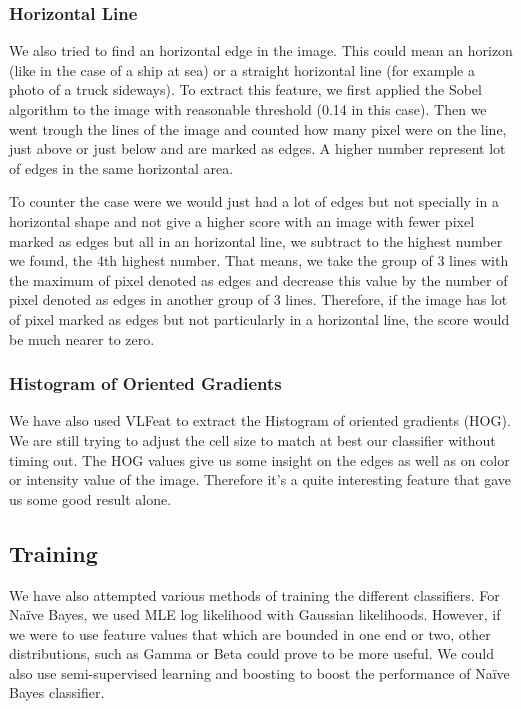 \documentclass{article} %
\begin{document}
\subsubsection{Horizontal Line}

We also tried to find an horizontal edge in the image. This could mean an horizon (like in the case of a ship at sea) or a straight horizontal line (for example a photo of a truck sideways). To extract this feature, we first applied the Sobel algorithm to the image with reasonable threshold (0.14 in this case). Then we went trough the lines of the image and counted how many pixel were on the line, just above or just below and are marked as edges. A higher number represent lot of edges in the same horizontal area. 

To counter the case were we would just had a lot of edges but not specially in a horizontal shape and not give a higher score with an image with fewer pixel marked as edges but all in an horizontal line, we subtract to the highest number we found, the 4th highest number. That means, we take the group of 3 lines with the maximum of pixel denoted as edges and decrease this value by the number of pixel denoted as edges in another group of 3 lines. Therefore, if the image has lot of pixel marked as edges but not particularly in a horizontal line, the score would be much nearer to zero. 

\subsubsection{Histogram of Oriented Gradients}
We have also used VLFeat to extract the Histogram of oriented gradients (HOG).
We are still trying to adjust the cell size to match at best our classifier without timing out. 
The HOG values give us some insight on the edges as well as on color or intensity value of the image. Therefore it's a quite interesting feature that gave us some good result alone. 

\subsection{Training}
We have also attempted various methods of training the different classifiers. For Na\"ive Bayes, we used MLE log likelihood with Gaussian likelihoods. However, if we were to use feature values that which are bounded in one end or two, other distributions, such as Gamma or Beta could prove to be more useful. We could also use semi-supervised learning and boosting to boost the performance of Na\"ive Bayes classifier.
\end{document}
